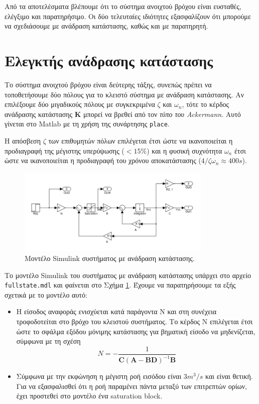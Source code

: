 \documentclass[a4paper, 11pt, english, greek]{article}
\begin{document}
Από τα αποτελέσματα βλέπουμε ότι το σύστημα ανοιχτού βρόχου είναι ευσταθές, ελέγξιμο και παρατηρήσιμο.
Οι δύο τελευταίες ιδιότητες εξασφαλίζουν ότι μπορούμε να σχεδιάσουμε με ανάδραση κατάστασης, καθώς και με παρατηρητή.

\section{Ελεγκτής ανάδρασης κατάστασης}
Το σύστημα ανοιχτού βρόχου είναι δεύτερης τάξης, συνεπώς πρέπει να τοποθετήσουμε δύο πόλους για το κλειστό
σύστημα με ανάδραση κατάστασης.
Αν επιλέξουμε δύο μιγαδικούς πόλους με συγκεκριμένα $\zeta$ και $ω_n$, τότε το κέρδος ανάδρασης κατάστασης $\mathbf{K}$
μπορεί να βρεθεί από τον \emph{τύπο του \textlatin{Ackermann}}.
Αυτό γίνεται στο \textlatin{Matlab} με τη χρήση της συνάρτησης \textlatin{\texttt{place}}.

Η απόσβεση $\zeta$ των επιθυμητών πόλων επιλέγεται έτσι ώστε να ικανοποιείται η προδιαγραφή της μέγιστης υπερύψωσης
($<15\%$) και η φυσική συχνότητα $ω_n$ έτσι ώστε να ικανοποιείται η προδιαγραφή του χρόνου αποκατάστασης
($4/\zeta ω_n\approx 400s$).

\begin{figure}[htb]
  \centering
  \includegraphics[width=350px]{full_state}
  \caption{Μοντέλο \textlatin{Simulink} συστήματος με ανάδραση κατάστασης.}
  \label{fig:full_state}
\end{figure}

Το μοντέλο \textlatin{Simulink} του συστήματος με ανάδραση κατάστασης υπάρχει στο αρχείο
\textlatin{\texttt{fullstate.mdl}} και φαίνεται στο Σχήμα \ref{fig:full_state}.
Έχουμε να παρατηρήσουμε τα εξής σχετικά με το μοντέλο αυτό:
\begin{itemize}
	\item Η είσοδος αναφοράς ενισχύεται κατά παράγοντα Ν και στη συνέχεια τροφοδοτείται στο βρόχο του κλειστού συστήματος.
	      Το κέρδος Ν επιλέγεται έτσι ώστε το σφάλμα εξόδου μόνιμης κατάστασης για βηματική είσοδο να μηδενίζεται,
	      σύμφωνα με τη σχέση
	      \begin{equation}
	      	\label{eq:ref_gain}
	      	N = -\frac{\displaystyle 1}{\mathbf{C}(\mathbf{A}-\mathbf{B}\mathbf{D})^{-1} \mathbf{B}}
	      \end{equation}
	\item Σύμφωνα με την εκφώνηση η μέγιστη ροή εισόδου είναι $3 m^3/s$ και είναι θετική.
	      Για να εξασφαλισθεί ότι η ροή παραμένει πάντα μεταξύ των επιτρεπτών ορίων, έχει προστεθεί στο μοντέλο
	      ένα \textlatin{saturation block}.
\end{itemize}
\end{document}
